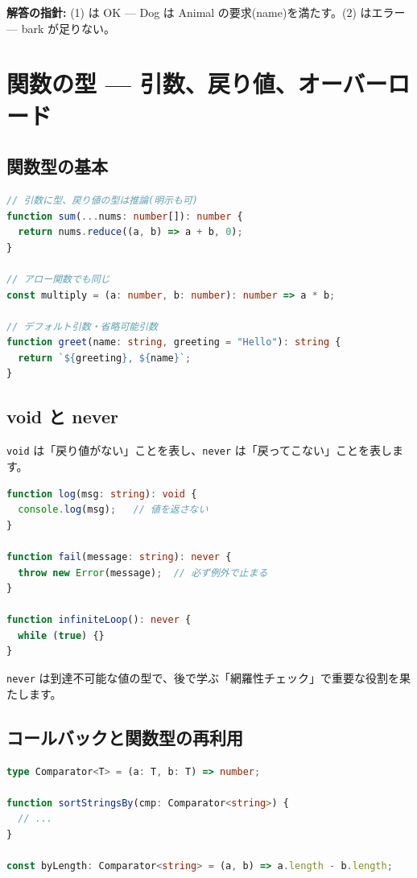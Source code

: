 \documentclass{article}
\begin{document}
\textbf{解答の指針:} (1) は OK — Dog は Animal の要求(name)を満たす。(2) はエラー — bark が足りない。

\section{関数の型 — 引数、戻り値、オーバーロード}

\subsection{関数型の基本}

\begin{lstlisting}[language=TypeScript]
// 引数に型、戻り値の型は推論(明示も可)
function sum(...nums: number[]): number {
  return nums.reduce((a, b) => a + b, 0);
}

// アロー関数でも同じ
const multiply = (a: number, b: number): number => a * b;

// デフォルト引数・省略可能引数
function greet(name: string, greeting = "Hello"): string {
  return `${greeting}, ${name}`;
}
\end{lstlisting}

\subsection{void と never}

\texttt{void} は「戻り値がない」ことを表し、\texttt{never} は「戻ってこない」ことを表します。

\begin{lstlisting}[language=TypeScript]
function log(msg: string): void {
  console.log(msg);   // 値を返さない
}

function fail(message: string): never {
  throw new Error(message);  // 必ず例外で止まる
}

function infiniteLoop(): never {
  while (true) {}
}
\end{lstlisting}

\texttt{never} は到達不可能な値の型で、後で学ぶ「網羅性チェック」で重要な役割を果たします。

\subsection{コールバックと関数型の再利用}

\begin{lstlisting}[language=TypeScript]
type Comparator<T> = (a: T, b: T) => number;

function sortStringsBy(cmp: Comparator<string>) {
  // ...
}

const byLength: Comparator<string> = (a, b) => a.length - b.length;
\end{lstlisting}
\end{document}
